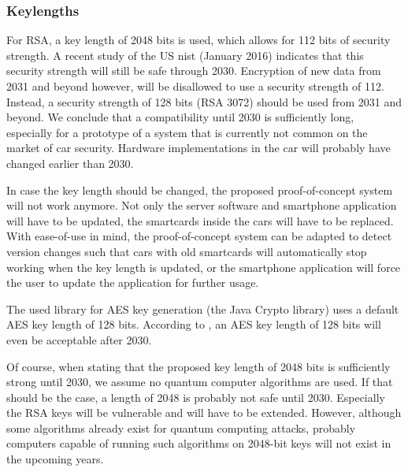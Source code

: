 \documentclass[12pt,a4paper, oneside]{article}
\begin{document}
\subsubsection{Keylengths}
For RSA, a key length of 2048 bits is used, which allows for 112 bits of security strength. A recent study of the US \gls{nist} \cite{Publication2007} (January 2016) indicates that this security strength will still be safe through 2030. Encryption of new data from 2031 and beyond however, will be disallowed to use a security strength of 112. Instead, a security strength of 128 bits (RSA 3072) should be used from 2031 and beyond. We conclude that a compatibility until 2030 is sufficiently long, especially for a prototype of a system that is currently not common on the market of car security. Hardware implementations in the car will probably have changed earlier than 2030.\par
In case the key length should be changed, the proposed proof-of-concept system will not work anymore. Not only the server software and smartphone application will have to be updated, the smartcards inside the cars will have to be replaced. With ease-of-use in mind, the proof-of-concept system can be adapted to detect version changes such that cars with old smartcards will automatically stop working when the key length is updated, or the smartphone application will force the user to update the application for further usage.\par
The used library for AES key generation (the Java Crypto library) uses a default AES key length of 128 bits. According to \cite{Publication2007}, an AES key length of 128 bits will even be acceptable after 2030.\par
Of course, when stating that the proposed key length of 2048 bits is sufficiently strong until 2030, we assume no quantum computer algorithms are used. If that should be the case, a length of 2048 is probably not safe until 2030. Especially the RSA keys will be vulnerable and will have to be extended. However, although some algorithms already exist for quantum computing attacks, probably computers capable of running such algorithms on 2048-bit keys will not exist in the upcoming years.
\end{document}
